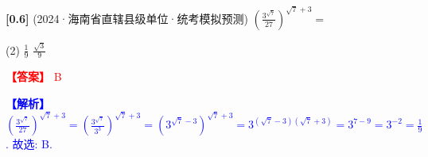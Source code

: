 \documentclass[varwidth=16cm, border=2mm]{standalone}
\begin{document}
\textbf{[0.6]} (2024·海南省直辖县级单位·统考模拟预测) $(\frac{3^{\sqrt{7}}}{27})^{\sqrt{7}+3}=$

\begin{tasks}(2)
    \task $\frac{1}{9}$
    \task $\frac{\sqrt{3}}{9}$
\end{tasks}

\vspace{0.2cm}\par\noindent\textcolor{red}{\textbf{【答案】} B}
\par\noindent\textcolor{blue}{\textbf{【解析】} $(\frac{3^{\sqrt{7}}}{27})^{\sqrt{7}+3} = (\frac{3^{\sqrt{7}}}{3^3})^{\sqrt{7}+3} = (3^{\sqrt{7}-3})^{\sqrt{7}+3} = 3^{(\sqrt{7}-3)(\sqrt{7}+3)} = 3^{7-9} = 3^{-2} = \frac{1}{9}$. 故选: B.}
\end{document}
